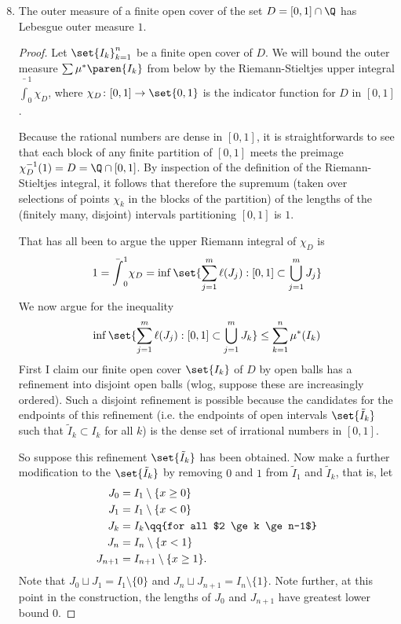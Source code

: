 \documentclass[onesided]{ccg-pset}
\begin{document}
\begin{enumerate}
\setcounter{enumi}{7}
\item The outer measure of a finite open cover of the set $D = [0,1] \cap \Q$ has Lebesgue outer measure $1$.
\begin{proof}
    Let $\set{ I_k }_{k=1}^n$ be a finite open cover of $D$. We will bound the outer measure $\sum \mu^*\paren{I_k}$ from below by the Riemann-Stieltjes upper integral $\bar\int_0^1 \chi_D$, where $\chi_D \colon [0,1] \to \set{0,1}$ is the indicator function for $D$ in $[0,1]$. 

    Because the rational numbers are dense in $[0,1]$, it is straightforwards to see that each block of any finite partition of $[0,1]$ meets the preimage $\chi^{-1}_D(1) = D = \Q \cap [0,1]$. By inspection of the definition of the Riemann-Stieltjes integral, it follows that therefore the supremum (taken over selections of points $\chi_k$ in the blocks of the partition) of the lengths of the (finitely many, disjoint) intervals partitioning $[0,1]$ is $1$.

    That has all been to argue the upper Riemann integral of $\chi_D$ is 
    \begin{equation*}
        1 = \bar\int_0^1 \chi_D  = \inf\set{\sum_{j=1}^m \ell(J_j) : [0,1] \subset \bigcup_{j=1}^m J_j} 
    \end{equation*}
    We now argue for the inequality 
    \begin{equation}
        \label{riemannupper}
        \inf\set{\sum_{j=1}^m \ell(J_j) : [0,1] \subset \bigcup_{j=1}^m J_k} \le \sum_{k=1}^n\mu^*(I_k)
    \end{equation}
    First I claim our finite open cover $\set{I_k}$ of $D$ by open balls has a refinement into disjoint open balls (wlog, suppose these are increasingly ordered). Such a disjoint refinement is possible because the candidates for the endpoints of this refinement (i.e. the endpoints of open intervals $\set{\tilde I_k}$ such that $\tilde I_k \subset I_k$ for all $k$) is the dense set of irrational numbers in $[0,1]$. 

    So suppose this refinement $\set{\tilde I_k}$ has been obtained. Now make a further modification to the $\set{\tilde I_k}$ by removing $0$ and $1$ from $\tilde I_1$ and $\tilde I_k$, that is, let
    \begin{align*}
        J_0 &= I_1 \setminus \{x \ge 0\}\\
        J_1 &= I_1 \setminus \{x  < 0\}\\
        J_k &= I_k \qq{for all $2 \ge k \ge n-1$}\\
        J_n &= I_n \setminus \{x  < 1\}\\
        J_{n+1} &= I_{n+1} \setminus \{x  \ge 1\}.
    \end{align*}
    Note that $J_0 \sqcup J_1 = I_1 \setminus \{0\}$ and $J_n \sqcup J_{n+1} = I_n \setminus \{1\}$. Note further, at this point in the construction, the lengths of $J_0$ and $J_{n+1}$ have greatest lower bound $0$.


\end{proof}
\end{enumerate}
\end{document}
